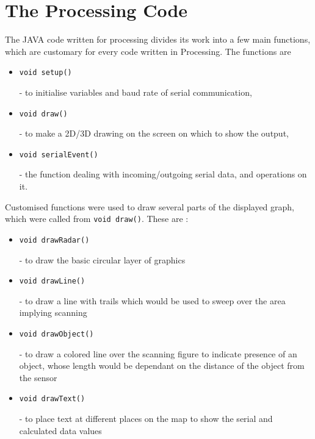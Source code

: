 \section{The Processing Code}
The JAVA code written for processing divides its work into a few main functions, which are customary for every code written in Processing. The functions are
\begin{itemize}
	\item \begin{verbatim}void setup()\end{verbatim} - to initialise variables and baud rate of serial communication,
	\item \begin{verbatim}void draw()\end{verbatim} - to make a 2D/3D drawing on the screen on which to show the output,
	\item \begin{verbatim}void serialEvent()\end{verbatim} - the function dealing with incoming/outgoing serial data, and operations on it.
\end{itemize}
Customised functions were used to draw several parts of the displayed graph, which were called from \texttt{void draw()}. These are :
\begin{itemize}
	\item \begin{verbatim}void drawRadar()\end{verbatim} - to draw the basic circular layer of graphics
	\item \begin{verbatim}void drawLine()\end{verbatim} - to draw a line with trails which would be used to sweep over the area implying scanning
	\item \begin{verbatim}void drawObject()\end{verbatim} - to draw a colored line over the scanning figure to indicate presence of an object, whose length would be dependant on the distance of the object from the sensor
	\item \begin{verbatim}void drawText()\end{verbatim} - to place text at different places on the map to show the serial and calculated data values
\end{itemize}
\clearpage